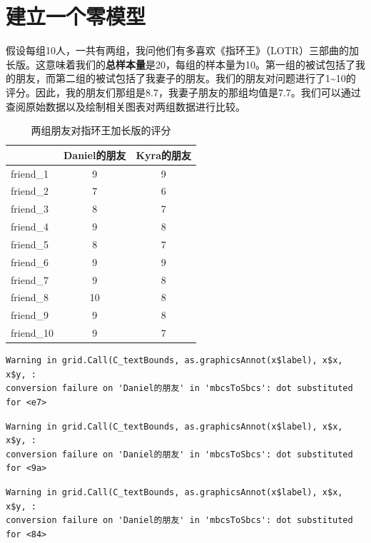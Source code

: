 \documentclass[
  letterpaper,
  DIV=11,
  numbers=noendperiod]{scrreprt}
\begin{document}
\hypertarget{ux5efaux7acbux4e00ux4e2aux96f6ux6a21ux578b}{%
\section{建立一个零模型}\label{ux5efaux7acbux4e00ux4e2aux96f6ux6a21ux578b}}

假设每组10人，一共有两组，我问他们有多喜欢《指环王》（LOTR）三部曲的加长版。这意味着我们的\textbf{总样本量}是20，每组的样本量为10。第一组的被试包括了我的朋友，而第二组的被试包括了我妻子的朋友。我们的朋友对问题进行了1\textasciitilde10的评分。因此，我的朋友们那组是8.7，我妻子朋友的那组均值是7.7。我们可以通过查阅原始数据以及绘制相关图表对两组数据进行比较。

\begin{table}

\caption{两组朋友对指环王加长版的评分}
\begin{tabular}[t]{lcc}
\toprule
 & Daniel的朋友 & Kyra的朋友\\
\midrule
friend\_1 & 9 & 9\\
friend\_2 & 7 & 6\\
friend\_3 & 8 & 7\\
friend\_4 & 9 & 8\\
friend\_5 & 8 & 7\\
\addlinespace
friend\_6 & 9 & 9\\
friend\_7 & 9 & 8\\
friend\_8 & 10 & 8\\
friend\_9 & 9 & 8\\
friend\_10 & 9 & 7\\
\bottomrule
\end{tabular}
\end{table}

\begin{verbatim}
Warning in grid.Call(C_textBounds, as.graphicsAnnot(x$label), x$x, x$y, :
conversion failure on 'Daniel的朋友' in 'mbcsToSbcs': dot substituted for <e7>
\end{verbatim}

\begin{verbatim}
Warning in grid.Call(C_textBounds, as.graphicsAnnot(x$label), x$x, x$y, :
conversion failure on 'Daniel的朋友' in 'mbcsToSbcs': dot substituted for <9a>
\end{verbatim}

\begin{verbatim}
Warning in grid.Call(C_textBounds, as.graphicsAnnot(x$label), x$x, x$y, :
conversion failure on 'Daniel的朋友' in 'mbcsToSbcs': dot substituted for <84>
\end{verbatim}
\end{document}
